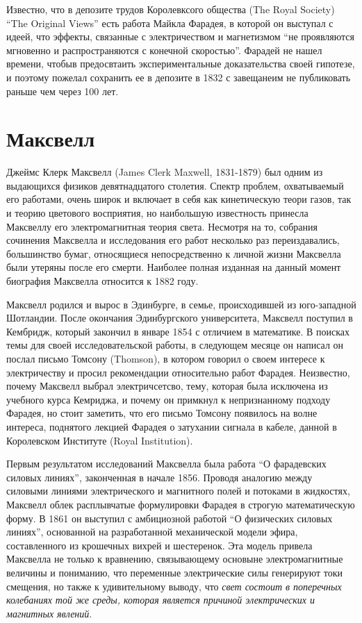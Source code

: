 \documentclass[12pt, oneside, a4paper]{article}
\begin{document}
Известно, что в депозите трудов Королевксого общества (The Royal Society)  ``The Original Views'' есть работа Майкла Фарадея, в которой он выступал с идеей, что эффекты, связанные с электричеством и магнетизмом ``не проявляются мгновенно и распространяются с конечной скоростью''. Фарадей не нашел времени, чтобыв предосвтаить экспериментальные доказательства своей гипотезе, и поэтому пожелал сохранить ее в депозите в 1832 с завещанеим не публиковать раньше чем через 100 лет.
\section*{Максвелл}
Джеймс Клерк Максвелл (James Clerk Maxwell, 1831-1879) был одним из выдающихся физиков девятнадцатого столетия. Спектр проблем, охватываемый его работами, очень широк и включает в себя как кинетическую теори газов, так и теорию цветового восприятия, но наибольшую известность принесла Максвеллу его электромагнитная теория света. Несмотря на то, собрания сочинения Максвелла и исследования его работ несколько раз переиздавались, большинство бумаг, относящиеся непосредственно к личной жизни Максвелла были утеряны после его смерти. Наиболее полная изданная на данный момент биография Максвелла относится к 1882 году.

Максвелл родился и вырос в Эдинбурге, в семье, происходившей из юго-западной Шотландии. После окончания Эдинбургского университета, Максвелл поступил в Кембридж, который закончил в январе 1854 с отличием в математике. В поисках темы для своей исследовательской работы, в следующем месяце он написал он послал письмо Томсону (Thomson), в котором говорил о своем интересе к электричеству и просил рекомендации относительно работ Фарадея. Неизвестно, почему Максвелл выбрал электричсетсво, тему, которая была исключена из учебного курса Кемриджа, и почему он примкнул к непризнанному подходу Фарадея, но стоит заметить, что  его письмо Томсону появилось на волне интереса, поднятого лекцией Фарадея о затухании сигнала в кабеле, данной в Королевском Институте (Royal Institution). 

Первым результатом исследований Максвелла была работа ``О фарадевских силовых линиях'', законченная в начале 1856. Проводя аналогию между силовыми линиями электрического и магнитного полей и потоками в жидкостях, Максвелл облек расплывчатые формулировки Фарадея в строгую математическую форму. В 1861 он выступил с амбициозной работой ``О физических силовых линиях'', основанной на разработанной механической модели эфира, составленного из крошечных вихрей и шестеренок. Эта модель привела Максвелла не только к вравнению, связывающему основыне электромагнитные величины и пониманию, что переменные электрические силы генерируют токи смещения, но также к удивительному выводу, что \emph{свет состоит в поперечных колебаниях той же среды, которая является причиной электрических и магнитных явлений}. 
\end{document}
